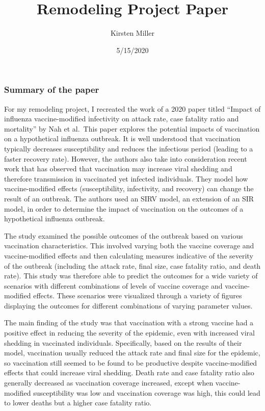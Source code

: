 \documentclass[]{article}
\title{Remodeling Project Paper}
\author{Kirsten Miller}
\date{5/15/2020}
\begin{document}
\maketitle

{
\setcounter{tocdepth}{2}
\tableofcontents
}
\hypertarget{summary-of-the-paper}{%
\subsubsection{Summary of the paper}\label{summary-of-the-paper}}

For my remodeling project, I recreated the work of a 2020 paper titled
``Impact of influenza vaccine-modified infectivity on attack rate, case
fatality ratio and mortality'' by Nah et al.~This paper explores the
potential impacts of vaccination on a hypothetical influenza outbreak.
It is well understood that vaccination typically decreases
susceptibility and reduces the infectious period (leading to a faster
recovery rate). However, the authors also take into consideration recent
work that has observed that vaccination may increase viral shedding and
therefore transmission in vaccinated yet infected individuals. They
model how vaccine-modified effects (susceptibility, infectivity, and
recovery) can change the result of an outbreak. The authors used an SIRV
model, an extension of an SIR model, in order to determine the impact of
vaccination on the outcomes of a hypothetical influenza outbreak.

The study examined the possible outcomes of the outbreak based on
various vaccination characteristics. This involved varying both the
vaccine coverage and vaccine-modified effects and then calculating
measures indicative of the severity of the outbreak (including the
attack rate, final size, case fatality ratio, and death rate). This
study was therefore able to predict the outcomes for a wide variety of
scenarios with different combinations of levels of vaccine coverage and
vaccine-modified effects. These scenarios were visualized through a
variety of figures displaying the outcomes for different combinations of
varying parameter values.

The main finding of the study was that vaccination with a strong vaccine
had a positive effect in reducing the severity of the epidemic, even
with increased viral shedding in vaccinated individuals. Specifically,
based on the results of their model, vaccination usually reduced the
attack rate and final size for the epidemic, so vaccination still seemed
to be found to be productive despite vaccine-modified effects that could
increase viral shedding. Death rate and case fatality ratio also
generally decreased as vaccination coverage increased, except when
vaccine-modified susceptibility was low and vaccination coverage was
high, this could lead to lower deaths but a higher case fatality ratio.
\end{document}
